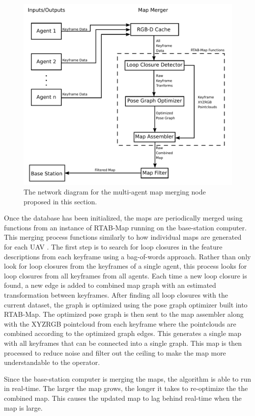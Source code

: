 \documentclass[letterpaper, 10 pt, conference]{ieeeconf}  %
\begin{document}
\begin{figure}
\centering
\includegraphics[width=0.8\linewidth]{map_merger_network}
\caption[The network diagram for the multi-agent map merging node.]{The network diagram for the multi-agent map merging node proposed in this section.}
\label{fig:map_merge}
\end{figure}

Once the database has been initialized, the maps are periodically merged using functions from an instance of RTAB-Map running on the base-station computer. This merging process functions similarly to how individual maps are generated for each UAV \cite{Labbe2011a,Labbe2013,Labbe2019}. The first step is to search for loop closures in the feature descriptions from each keyframe using a bag-of-words approach. Rather than only look for loop closures from the keyframes of a single agent, this process looks for loop closures from all keyframes from all agents. Each time a new loop closure is found, a new edge is added to combined map graph with an estimated transformation between keyframes. After finding all loop closures with the current dataset, the graph is optimized using the pose graph optimizer built into RTAB-Map. The optimized pose graph is then sent to the map assembler along with the XYZRGB pointcloud from each keyframe where the pointclouds are combined according to the optimized graph edges. This generates a single map with all keyframes that can be connected into a single graph. This map is then processed to reduce noise and filter out the ceiling to make the map more understandable to the operator.

Since the base-station computer is merging the maps, the algorithm is able to run in real-time. The larger the map grows, the longer it takes to re-optimize the the combined map. This causes the updated map to lag behind real-time when the map is large.
\end{document}
